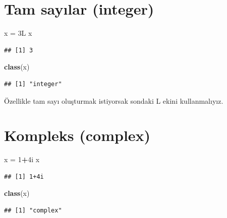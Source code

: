 \documentclass[
]{book}
\newenvironment{Shaded}{\begin{snugshade}}{\end{snugshade}}
\newcommand{\DecValTok}[1]{\textcolor[rgb]{0.00,0.00,0.81}{#1}}
\newcommand{\KeywordTok}[1]{\textcolor[rgb]{0.13,0.29,0.53}{\textbf{#1}}}
\newcommand{\NormalTok}[1]{#1}
\newcommand{\OperatorTok}[1]{\textcolor[rgb]{0.81,0.36,0.00}{\textbf{#1}}}
\newcommand{\StringTok}[1]{\textcolor[rgb]{0.31,0.60,0.02}{#1}}
\begin{document}
\hypertarget{tam-sayux131lar-integer}{%
\section{Tam sayılar (integer)}\label{tam-sayux131lar-integer}}

\begin{Shaded}
\begin{Highlighting}[]
\NormalTok{x =}\StringTok{ }\NormalTok{3L}
\NormalTok{x}
\end{Highlighting}
\end{Shaded}

\begin{verbatim}
## [1] 3
\end{verbatim}

\begin{Shaded}
\begin{Highlighting}[]
\KeywordTok{class}\NormalTok{(x)}
\end{Highlighting}
\end{Shaded}

\begin{verbatim}
## [1] "integer"
\end{verbatim}

Özellikle tam sayı oluşturmak istiyorsak sondaki L ekini kullanmalıyız.

\hypertarget{kompleks-complex}{%
\section{Kompleks (complex)}\label{kompleks-complex}}

\begin{Shaded}
\begin{Highlighting}[]
\NormalTok{x =}\StringTok{ }\DecValTok{1}\OperatorTok{+}\NormalTok{4i}
\NormalTok{x}
\end{Highlighting}
\end{Shaded}

\begin{verbatim}
## [1] 1+4i
\end{verbatim}

\begin{Shaded}
\begin{Highlighting}[]
\KeywordTok{class}\NormalTok{(x)}
\end{Highlighting}
\end{Shaded}

\begin{verbatim}
## [1] "complex"
\end{verbatim}
\end{document}
